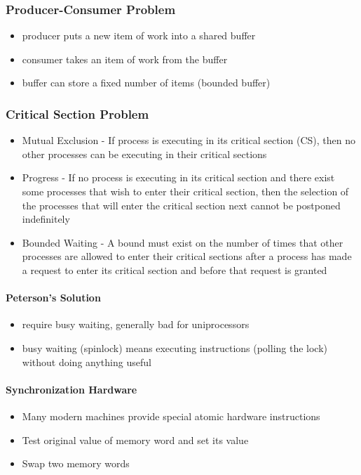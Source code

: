 \documentclass[a4paper]{article}
\begin{document}
\subsubsection{Producer-Consumer Problem}
\begin{itemize}
	\item producer puts a new item of work into a shared buffer
	\item consumer takes an item of work from the buffer
	\item buffer can store a fixed number of items (bounded buffer)
\end{itemize}
\subsubsection{Critical Section Problem}
\begin{itemize}
	\item Mutual Exclusion - If process is executing in its critical section (CS), then no other processes can be executing in their critical sections
	\item Progress - If no process is executing in its critical section and there exist some processes that wish to enter their critical section, then the selection of the processes that will enter the critical section next cannot be postponed indefinitely
	\item Bounded Waiting - A bound must exist on the number of times that other processes are allowed to enter their critical sections after a process has made a request to enter its critical section and before that request is granted
\end{itemize}
\paragraph{Peterson's Solution}
\begin{itemize}
	\item require busy waiting, generally bad for uniprocessors
	\item busy waiting (spinlock) means executing instructions (polling the lock) without doing anything useful
\end{itemize}
\paragraph{Synchronization Hardware}
\begin{itemize}
	\item Many modern machines provide special atomic hardware instructions
	\item Test original value of memory word and set its value
	\item Swap two memory words
\end{itemize}
\end{document}
